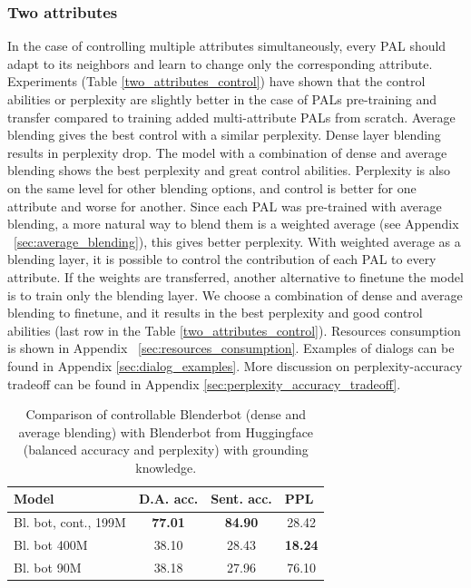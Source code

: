 \documentclass[11pt]{article}
\begin{document}
\subsubsection{Two attributes}

In the case of controlling multiple attributes simultaneously, every PAL should adapt to its neighbors and learn to change only the corresponding attribute. Experiments (Table \ref{two_attributes_control}) have shown that the control abilities or perplexity are slightly better in the case of PALs pre-training and transfer compared to training added multi-attribute PALs from scratch. Average blending gives the best control with a similar perplexity. Dense layer blending results in perplexity drop. The model with a combination of dense and average blending shows the best perplexity and great control abilities.
Perplexity is also on the same level for other blending options, and control is better for one attribute and worse for another. Since each PAL was pre-trained with average blending, a more natural way to blend them is a weighted average (see Appendix ~\ref{sec:average_blending}), this gives better perplexity. With weighted average as a blending layer, it is possible to control the contribution of each PAL to every attribute. 
If the weights are transferred, another alternative to finetune the model is to train only the blending layer. We choose a combination of dense and average blending to finetune, and it results in the best perplexity and good control abilities (last row in the Table \ref{two_attributes_control}). Resources consumption is shown in Appendix ~\ref{sec:resources_consumption}. Examples of dialogs can be found in Appendix \ref{sec:dialog_examples}. More discussion on perplexity-accuracy tradeoff can be found in Appendix \ref{sec:perplexity_accuracy_tradeoff}.

\begin{table}[ht]
\fontsize{9}{11}
\selectfont 
\centering
\begin{tabular}{lccc}
\hline
Model                         & D.A. acc. & Sent. acc. & \multicolumn{1}{l}{PPL} \\ \hline
Bl. bot, cont., 199M      & \textbf{77.01}                 & \textbf{84.90}               & 28.42                               \\
Bl. bot 400M & 38.10                 & 28.43               & \textbf{18.24}                                \\
Bl. bot 90M  & 38.18                 & 27.96               & 76.10                              \\ \hline
\end{tabular}
\caption{Comparison of controllable Blenderbot (dense and average blending) with Blenderbot from Huggingface (balanced accuracy and perplexity) with grounding knowledge.}
\label{blenderbot_cont_and_baselines}
\end{table}
\end{document}
